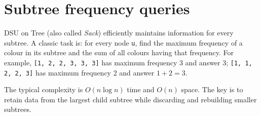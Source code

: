 \section{Subtree frequency queries}

DSU on Tree (also called \emph{Sack}) efficiently maintains information for every subtree. A classic task is: for every node \texttt{u}, find the maximum frequency of a colour in its subtree and the sum of all colours having that frequency. For example, \texttt{[1, 2, 2, 3, 3, 3]} has maximum frequency 3 and answer 3; \texttt{[1, 1, 2, 2, 3]} has maximum frequency 2 and answer $1+2=3$.

The typical complexity is $O(n \log n)$ time and $O(n)$ space. The key is to retain data from the largest child subtree while discarding and rebuilding smaller subtrees.

